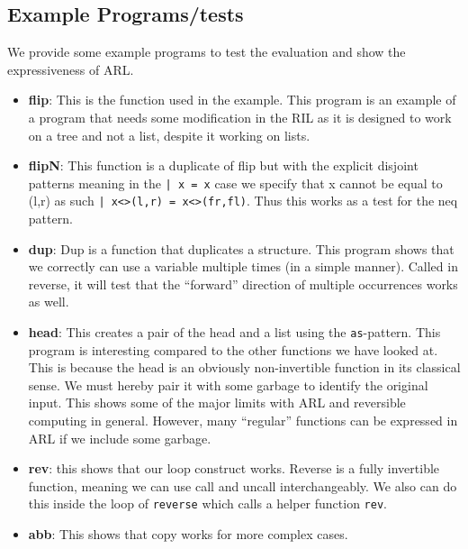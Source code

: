 \documentclass[a4paper]{article}
\begin{document}
\subsection{Example Programs/tests}
\label{sec:orgdf85969}
We provide some example programs to test the evaluation and show the expressiveness of ARL.

\begin{itemize}
\item \textbf{flip}: This is the function used in the example. This program is an example of a program that needs some modification in the RIL as it is designed to work on a tree and not a list, despite it working on lists.
\item \textbf{flipN}: This function is a duplicate of flip but with the explicit disjoint patterns meaning in the \texttt{| x = x} case we specify that x cannot be equal to (l,r) as such \texttt{| x<>(l,r) = x<>(fr,fl)}. Thus this works as a test for the neq pattern.
\item \textbf{dup}: Dup is a function that duplicates a structure. This program shows that we correctly can use a variable multiple times (in a simple manner). Called in reverse, it will test that the ``forward'' direction of multiple occurrences works as well.
\item \textbf{head}: This creates a pair of the head and a list using the \texttt{as}-pattern. This program is interesting compared to the other functions we have looked at. This is because the head is an obviously non-invertible function in its classical sense. We must hereby pair it with some garbage to identify the original input. This shows some of the major limits with ARL and reversible computing in general. However, many ``regular'' functions can be expressed in ARL if we include some garbage.
\item \textbf{rev}: this shows that our loop construct works. Reverse is a fully invertible function, meaning we can use call and uncall interchangeably. We also can do this inside the loop of \texttt{reverse} which calls a helper function \texttt{rev}.
\item \textbf{abb}: This shows that copy works for more complex cases.
\end{itemize}
\end{document}
